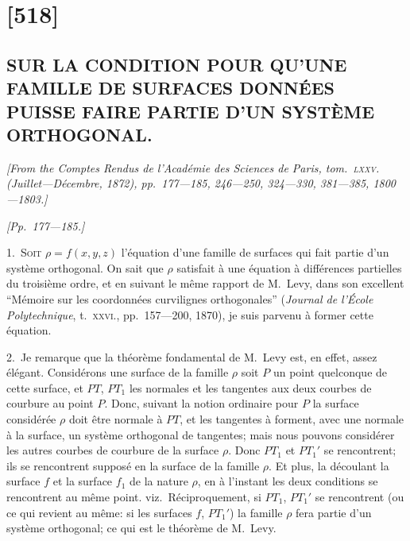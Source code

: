 \documentclass[11pt,a4paper]{book}
\begin{document}
\section{[518]}
\subsection{SUR LA CONDITION POUR QU'UNE FAMILLE DE SURFACES DONN\'EES PUISSE FAIRE PARTIE D'UN SYST\`EME ORTHOGONAL.}

\begin{center}
\textit{[From the Comptes Rendus de l'Acad\'emie des Sciences de Paris, tom.\ \textsc{lxxv.} (Juillet---D\'ecembre, 1872), pp.~177---185, 246---250, 324---330, 381---385, 1800---1803.]}
\end{center}

\begin{center}
\textit{[Pp.~177---185.]}
\end{center}

1.~\textsc{Soit} $\rho = f(x, y, z)$ l'\'equation d'une famille de surfaces qui fait partie d'un
syst\`eme orthogonal. On sait que $\rho$ satisfait \`a une \'equation \`a diff\'erences partielles du
troisi\`eme ordre, et en suivant le m\^eme rapport de M.~Levy, dans son excellent ``M\'emoire
sur les coordonn\'ees curvilignes orthogonales'' (\textit{Journal de l'\'Ecole Polytechnique}, t.~\textsc{xxvi.},
pp.~157---200, 1870), je suis parvenu \`a former cette \'equation.

2.~Je remarque que la th\'eor\`eme fondamental de M.~Levy est, en effet, assez
\'el\'egant. Consid\'erons une surface de la famille $\rho$ soit $P$ un point quelconque de cette
surface, et $PT$, $PT_1$ les normales et les tangentes aux deux courbes de courbure
au point $P$. Donc, suivant la notion ordinaire pour $P$ la surface consid\'er\'ee $\rho$ doit
\^etre normale \`a $PT$, et les tangentes \`a forment, avec une normale \`a la surface, un syst\`eme
orthogonal de tangentes; mais nous pouvons consid\'erer les autres courbes de courbure
de la surface $\rho$. Donc $PT_1$ et $PT_1'$ se rencontrent; ils se rencontrent suppos\'e en
la surface de la famille $\rho$. Et plus, la d\'ecoulant la surface $f$ et la surface $f_1$
de la nature $\rho$, en \`a l'instant les deux conditions se rencontrent au m\^eme point.
viz.\ R\'eciproquement, si $PT_1$, $PT_1'$ se rencontrent (ou ce qui revient au m\^eme: si
les surfaces $f$, $PT_1'$) la famille $\rho$ fera partie d'un syst\`eme orthogonal; ce qui est le th\'eor\`eme
de M.~Levy.

\clearpage
\end{document}
